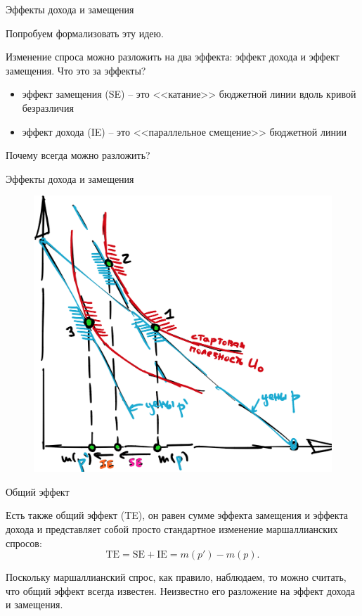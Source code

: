 \documentclass{beamer}
\begin{document}

\begin{frame}{Эффекты дохода и замещения}

Попробуем формализовать эту идею. 

Изменение спроса можно разложить на два эффекта: эффект дохода и эффект замещения. Что это за эффекты?

\begin{itemize}
\item \alert{эффект замещения} (SE) – это <<катание>> бюджетной линии вдоль кривой безразличия
\item \alert{эффект дохода} (IE) – это <<параллельное смещение>> бюджетной линии
\end{itemize}

Почему всегда можно разложить? 

\end{frame}

\begin{frame}{Эффекты дохода и замещения}

\begin{figure}[hbt]
\centering
\includegraphics[width=.8 \textwidth]{./SEIETE.png}
\end{figure}

\end{frame}

\begin{frame}{Общий эффект}

Есть также общий эффект (TE), он равен сумме эффекта замещения и эффекта дохода и представляет собой просто стандартное изменение маршаллианских спросов:
$$ \text{TE} = \text{SE} + \text{IE} = m(p') - m(p).$$

Поскольку маршаллианский спрос, как правило, наблюдаем, то можно считать, что общий эффект всегда известен. Неизвестно его разложение на эффект дохода и замещения.

\end{frame}
\end{document}
